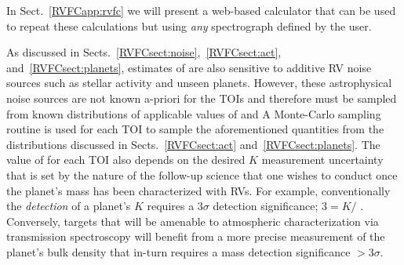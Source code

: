 In Sect.~\ref{RVFCapp:rvfc}
we will present a web-based \nrv{(}\sigRV{)} calculator that can be used to repeat these calculations but
using \emph{any} spectrograph defined by the user.



As discussed in Sects.~\ref{RVFCsect:noise},~\ref{RVFCsect:act}, and~\ref{RVFCsect:planets}, estimates of
\nrv{} are also sensitive to additive RV noise sources such as stellar activity and unseen planets.
However, these astrophysical noise sources are not known a-priori for the 
TOIs and therefore must be sampled from known distributions of applicable values of \sigact{}
and  A Monte-Carlo sampling routine is used for each TOI to sample the aforementioned
quantities from the distributions discussed in Sects.~\ref{RVFCsect:act} and~\ref{RVFCsect:planets}.
The value of \nrv{} for each TOI also depends on the desired $K$ measurement uncertainty
that is set by the nature of the
follow-up science that one wishes to conduct once the planet's mass has been characterized with RVs.
For example, conventionally the \emph{detection} of a planet's $K$ requires a $3\sigma$ detection
significance; $3 = K/$ \sigK{}. Conversely, targets that will be amenable to atmospheric
characterization via transmission spectroscopy will benefit from a more precise measurement of the
planet's bulk density that in-turn requires a mass detection significance $>3\sigma$.

